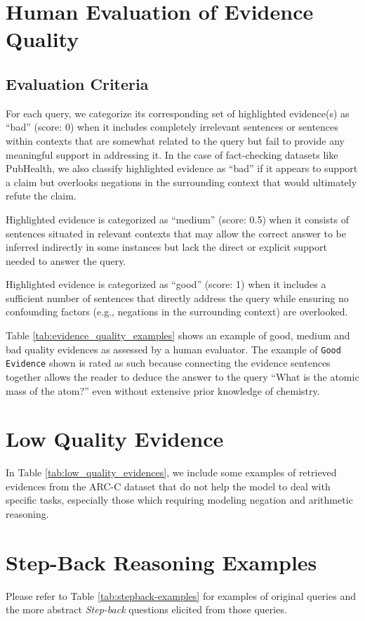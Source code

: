 \section{Human Evaluation of Evidence Quality}
\label{sec:appendix1}
\subsection{Evaluation Criteria}
For each query, we categorize its corresponding set of highlighted evidence(s) as ``bad'' (score: 0) when it includes completely irrelevant sentences or sentences within contexts that are somewhat related to the query but fail to provide any meaningful support in addressing it. In the case of fact-checking datasets like PubHealth, we also classify highlighted evidence as ``bad'' if it appears to support a claim but overlooks negations in the surrounding context that would ultimately refute the claim.

Highlighted evidence is categorized as ``medium'' (score: 0.5) when it consists of sentences situated in relevant contexts that may allow the correct answer to be inferred indirectly in some instances but lack the direct or explicit support needed to answer the query.

Highlighted evidence is categorized as ``good'' (score: 1) when it includes a sufficient number of sentences that directly address the query while ensuring no confounding factors (e.g., negations in the surrounding context) are overlooked.

Table \ref{tab:evidence_quality_examples} shows an example of good, medium and bad quality evidences as assessed by a human evaluator. The example of \texttt{Good Evidence} shown is rated as such because connecting the evidence sentences together allows the reader to deduce the answer to the query ``What is the atomic mass of the atom?'' even without extensive prior knowledge of chemistry.


\section{Low Quality Evidence}
\label{sec:appendix2}
In Table \ref{tab:low_quality_evidences}, we include some examples of retrieved evidences from the ARC-C dataset that do not help the model to deal with specific tasks, especially those which requiring modeling negation and arithmetic reasoning.

\section{Step-Back Reasoning Examples}
\label{sec:appendix3}
Please refer to Table \ref{tab:stepback-examples} for examples of original queries and the more abstract \textit{Step-back} questions elicited from those queries.

